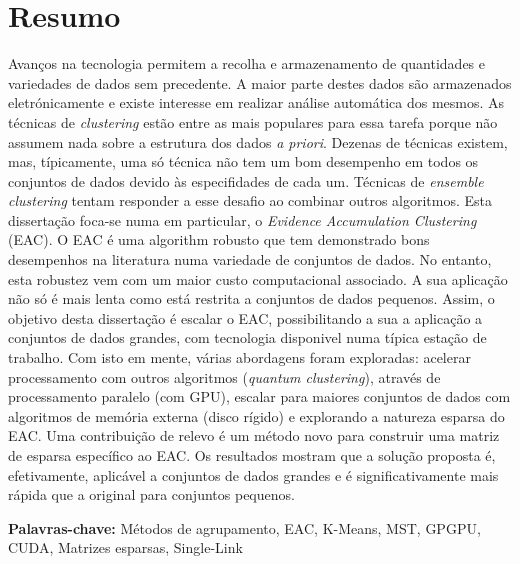 
\section*{Resumo}


Avanços na tecnologia permitem a recolha e armazenamento de quantidades e variedades de dados sem precedente.
A maior parte destes dados são armazenados eletrónicamente e existe interesse em realizar análise automática dos mesmos.
As técnicas de \emph{clustering} estão entre as mais populares para essa tarefa porque não assumem nada sobre a estrutura dos dados \emph{a priori}.
Dezenas de técnicas existem, mas, típicamente, uma só técnica não tem um bom desempenho em todos os conjuntos de dados devido às especifidades de cada um.
Técnicas de \emph{ensemble clustering} tentam responder a esse desafio ao combinar outros algoritmos.
Esta dissertação foca-se numa em particular, o \emph{Evidence Accumulation Clustering} (EAC).
O EAC é uma algorithm robusto que tem demonstrado bons desempenhos na literatura numa variedade de conjuntos de dados.
No entanto, esta robustez vem com um maior custo computacional associado.
A sua aplicação não só é mais lenta como está restrita a conjuntos de dados pequenos.
Assim, o objetivo desta dissertação é escalar o EAC, possibilitando a sua a aplicação a conjuntos de dados grandes, com tecnologia disponivel numa típica estação de trabalho.
Com isto em mente, várias abordagens foram exploradas: acelerar processamento com outros algoritmos (\emph{quantum clustering}), através de processamento paralelo (com GPU), escalar para maiores conjuntos de dados com algoritmos de memória externa (disco rígido) e explorando a natureza esparsa do EAC.
Uma contribuição de relevo é um método novo para construir uma matriz de esparsa específico ao EAC.
Os resultados mostram que a solução proposta é, efetivamente, aplicável a conjuntos de dados grandes e é significativamente mais rápida que a original para conjuntos pequenos.

\textbf{\Large Palavras-chave:} Métodos de agrupamento, EAC, K-Means, MST, GPGPU, CUDA, Matrizes esparsas, Single-Link

\cleardoublepage

